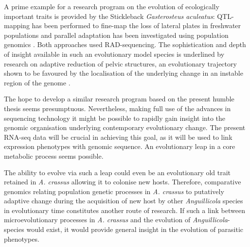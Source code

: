 A prime example for a research program on the evolution of
ecologically important traits is provided by the Stickleback
\textit{Gasterosteus aculeatus}: QTL-mapping has been performed to
fine-map the loss of lateral plates in freshwater populations
\cite{pmid18852878} and parallel adaptation has been investigated
using population genomics \cite{pmid20195501}. Both approaches used
RAD-sequencing. The sophistication and depth of insight available in
such an evolutionary model species is underlined by research on
adaptive reduction of pelvic structures, an evolutionary trajectory
shown to be favoured by the localisation of the underlying change in
an instable region of the genome \cite{pmid20007865}.

The hope to develop a similar research program based on the present
humble thesis seems presumptuous. Nevertheless, making full use of the
advances in sequencing technology it might be possible to rapidly gain
insight into the genomic organisation underlying contemporary
evolutionary change. The present RNA-seq data will be crucial in
achieving this goal, as it will be used to link expression phenotypes
with genomic sequence. An evolutionary leap in a core metabolic
process seems possible.

The ability to evolve via such a leap could even be an evolutionary
old trait retained in \textit{A. crassus} allowing it to colonise new
hosts. Therefore, comparative genomics relating population genetic
processes in \textit{A. crassus} to putatively adaptive change during
the acquisition of new host by other \textit{Anguillicola} species in
evolutionary time constitutes another route of research. If such a
link between microevolutionary processes in \textit{A. crassus} and
the evolution of \textit{Anguillicola}-species would exist, it would
provide general insight in the evolution of parasitic phenotypes.
